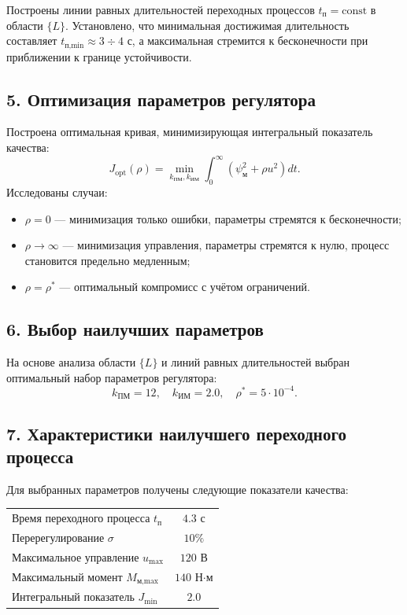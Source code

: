 \documentclass[14pt]{extreport}
\begin{document}
{Построены линии равных длительностей переходных процессов $t_{\text{п}} = \text{const}$ в области $\{L\}$. Установлено, что минимальная достижимая длительность составляет $t_{\text{п,min}} \approx 3 \div 4$ с, а максимальная стремится к бесконечности при приближении к границе устойчивости.

\subsection*{5. Оптимизация параметров регулятора}

Построена оптимальная кривая, минимизирующая интегральный показатель качества:
\[
J_{\text{opt}}(\rho) = \min_{k_{\text{ПМ}}, k_{\text{ИМ}}} \int_{0}^{\infty} \left( \psi_{\text{м}}^2 + \rho u^2 \right) dt.
\]
Исследованы случаи:
\begin{itemize}
    \item $\rho = 0$ — минимизация только ошибки, параметры стремятся к бесконечности;
    \item $\rho \to \infty$ — минимизация управления, параметры стремятся к нулю, процесс становится предельно медленным;
    \item $\rho = \rho^*$ — оптимальный компромисс с учётом ограничений.
\end{itemize}

\subsection*{6. Выбор наилучших параметров}

На основе анализа области $\{L\}$ и линий равных длительностей выбран оптимальный набор параметров регулятора:
\[
\boxed{k_{\text{ПМ}} = 12,\quad k_{\text{ИМ}} = 2.0,\quad \rho^* = 5\cdot10^{-4}}.
\]

\subsection*{7. Характеристики наилучшего переходного процесса}

Для выбранных параметров получены следующие показатели качества:
\begin{table}[h]
\centering
\begin{tabular}{|l|c|}
\hline
Время переходного процесса $t_{\text{п}}$ & $4.3$ с \\
Перерегулирование $\sigma$ & $10\%$ \\
Максимальное управление $u_{\text{max}}$ & $120$ В \\
Максимальный момент $M_{\text{м,max}}$ & $140$ Н$\cdot$м \\
Интегральный показатель $J_{\min}$ & $2.0$ \\
\hline
\end{tabular}
\end{table}

}
\end{document}

